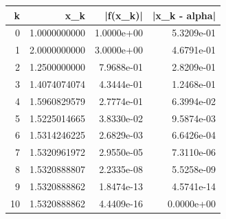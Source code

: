 \begin{tabular}{rrrr}
\toprule
k & x_k & |f(x_k)| & |x_k - alpha| \\
\midrule
0 & 1.0000000000 & 1.0000e+00 & 5.3209e-01 \\
1 & 2.0000000000 & 3.0000e+00 & 4.6791e-01 \\
2 & 1.2500000000 & 7.9688e-01 & 2.8209e-01 \\
3 & 1.4074074074 & 4.3444e-01 & 1.2468e-01 \\
4 & 1.5960829579 & 2.7774e-01 & 6.3994e-02 \\
5 & 1.5225014665 & 3.8330e-02 & 9.5874e-03 \\
6 & 1.5314246225 & 2.6829e-03 & 6.6426e-04 \\
7 & 1.5320961972 & 2.9550e-05 & 7.3110e-06 \\
8 & 1.5320888807 & 2.2335e-08 & 5.5258e-09 \\
9 & 1.5320888862 & 1.8474e-13 & 4.5741e-14 \\
10 & 1.5320888862 & 4.4409e-16 & 0.0000e+00 \\
\bottomrule
\end{tabular}
